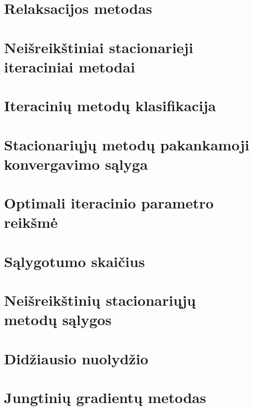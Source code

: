 \section{Relaksacijos metodas}
\cite[96-100]{textbook}
\section{Neišreikštiniai stacionarieji iteraciniai metodai}
\cite[110-112]{textbook}
\section{Iteracinių metodų klasifikacija}
\cite[104]{textbook}
\section{Stacionariųjų metodų pakankamoji konvergavimo sąlyga}
\cite[105]{textbook}
\section{Optimali iteracinio parametro reikšmė}
\cite[106]{textbook}
\section{Sąlygotumo skaičius}
\cite[107]{textbook}
\section{Neišreikštinių stacionariųjų metodų sąlygos}
\cite[109]{textbook}

\section{Didžiausio nuolydžio}
\cite[115-118]{textbook}
\section{Jungtinių gradientų metodas}
\cite[120-121]{textbook}


